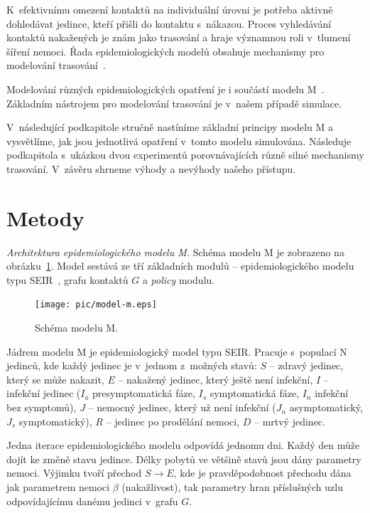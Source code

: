 K~efektivnímu omezení kontaktů na individuální úrovni je potřeba
aktivně dohledávat jedince, kteří přišli do kontaktu s~nákazou. Proces
vyhledávání kontaktů nakažených je znám jako trasování a hraje
významnou roli v~tlumení šíření nemoci. Řada epidemiologických modelů
obsahuje mechanismy pro modelování
trasování~\cite{pg:mooney2020,pg:kucharski2020,pg:Kerr2020,pg:keeling2020,pg:bilinski2020}.


Modelování různých epidemiologických opatření je i součástí 
modelu M~\cite{M-techrep2021}. Základním nástrojem pro modelování trasování je v~našem případě simulace.

V~následující podkapitole stručně nastíníme základní principy modelu M
a vy\-svět\-lí\-me, jak jsou jednotlivá opatření v~tomto modelu
simulována. Následuje podkapitola s~ukázkou dvou experimentů
porovnávajících různě silné mechanismy trasování. V~závěru shrneme
výhody a nevýhody našeho přístupu.


\section*{Metody}

\emph{Architektura epidemiologického modelu M.} Schéma modelu M je zobrazeno na ob\-ráz\-ku~\ref{pg:fig:mm}. Model sestává ze
tří základních modulů -- epidemiologického modelu typu
SEIR~\cite{pg:bailey1975}, grafu kontaktů $G$ a {\em policy} modulu.

\begin{figure}[ht]
  \centering
  \texttt{[image: pic/model-m.eps]}
  \caption{Schéma modelu M.}
  \label{pg:fig:mm}
\end{figure}



Jádrem modelu M je epidemiologický model typu SEIR. Pracuje s~populací N
jedinců, kde každý jedinec je v~jednom z~možných stavů: $S$ -- zdravý jedinec,
který se může nakazit, $E$ -- nakažený jedinec, který ještě není infekční, $I$ --
infekční jedinec ($I_a$ presymptomatická fáze, $I_s$ symptomatická fáze, $I_n$
infekční bez symptomů),  $J$ -- nemocný jedinec, který už není infekční ($J_n$
asymptomatický, $J_s$ symptomatický), $R$ -- jedinec po prodělání nemoci, $D$ --
mrtvý jedinec.

Jedna iterace epidemiologického modelu odpovídá jednomu dni. Každý den
může dojít ke změně stavu jedince. Délky pobytů ve většině stavů jsou
dány parametry nemoci. Výjimku tvoří přechod $S \rightarrow E$, kde
je pravděpodobnost přechodu dána jak parametrem nemoci $\beta$
(nakažlivost), tak parametry hran příslušných uzlu odpovídajícímu
danému jedinci v~grafu $G$.

